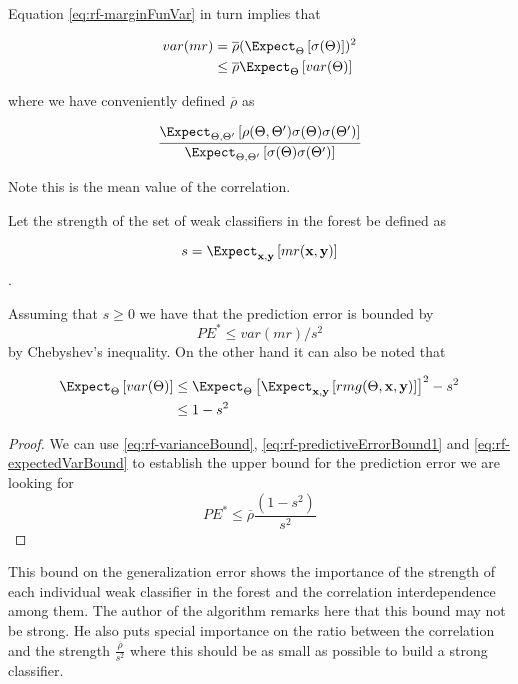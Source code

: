 Equation \ref{eq:rf-marginFunVar} in turn implies that 

\begin{equation}\label{eq:rf-varianceBound}
\begin{split}
var(mr) & =  \overline{\rho} (\Expect_{\Theta}\left[ \sigma(\Theta)\right] )^2 \\
		& \leq  \overline{\rho} \Expect_{\Theta} \left[ var(\Theta) \right] 
\end{split}
\end{equation}

where we have conveniently defined $\overline{\rho}$ as 

\begin{equation}\label{eq:rf-meanCorrelation}
 \frac{\Expect_{\Theta, \Theta'} \left[ \rho(\Theta, \Theta') \sigma(\Theta) \sigma(\Theta')\right]}
 {\Expect_{\Theta, \Theta'} \left[ \sigma(\Theta) \sigma(\Theta')\right]}
\end{equation}

Note this is the mean value of the correlation.

Let the strength of the set of weak classifiers in the forest be defined as 

$$s =  \Expect_{\textbf{x},\textbf{y}} \left[ mr(\textbf{x},\textbf{y} ) \right] $$.\label{eq:rf-strength}

Assuming that $s \geq 0$ we have that the prediction error is bounded by 
\begin{equation}\label{eq:rf-predictiveErrorBound1}
	PE^* \leq var(mr)/s^2
\end{equation}
by Chebyshev's inequality. On the other hand it can also be noted that


\begin{equation}\label{eq:rf-expectedVarBound}
\begin{split}
\Expect_{\Theta} \left[ var(\Theta) \right]  & \leq \Expect_{\Theta} \left[ \Expect_{\textbf{x},\textbf{y}}\left[ rmg(\Theta,\textbf{x},\textbf{y})   \right]  \right]^2 -s^2  \\
								& \leq 1-s^2
\end{split}
\end{equation}

\begin{proof}
We can use  \ref{eq:rf-varianceBound}, \ref{eq:rf-predictiveErrorBound1} and \ref{eq:rf-expectedVarBound} to establish the upper bound for the prediction error we are looking for
\begin{equation}\label{eq:rf-PEBound}
PE^* \leq \overline{\rho}\frac{(1-s^2)}{s^2}
\end{equation}
\end{proof}

This bound on the generalization error shows the importance of the strength of each individual weak classifier in the forest and the correlation interdependence among them. The author \cite{breiman-randomforests} of the algorithm remarks here that this bound may not be strong. He also puts special importance on the ratio between the correlation and the strength $\frac{\overline{\rho}}{s^2}$ where this should be as small as possible to build a strong classifier. 



